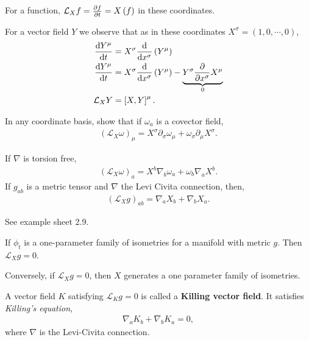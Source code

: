 \begin{example}
    For a function, $\mathcal{L}_X f = \pdv{f}{t} = X \left( f \right) $ in these coordinates.
\end{example}

For a vector field $Y$ we observe that as in these coordinates $X^{\sigma} = \left( 1,0,\cdots,0 \right) $,
\begin{align}
    \dv{Y^{\mu}}{t} &= X^{\sigma} \dv{x^{\sigma}} \left( Y^{\mu} \right)  \\
    \dv{Y^{\mu}}{t} &= X^{\sigma} \dv{x^{\sigma}} \left( Y^{\mu} \right) -  \underbrace{Y^{\sigma} \pdv{x^{\sigma}} X^{\mu}}_{0} \\
   \mathcal{L}_X Y &= \left[ X, Y \right]^{\mu}
.\end{align}

\begin{exercise}
    In any coordinate basis, show that if $\omega_a$ is a covector field,
    \begin{align}
        \left( \mathcal{L}_X \omega \right)_{\mu} = X^{\sigma} \partial_\sigma \omega_\mu + \omega_\sigma \partial_\mu X^{\sigma}
    .\end{align}

    If $\nabla$ is torsion free,
    \begin{align}
        \left( \mathcal{L}_X \omega \right)_a = X^{b} \nabla_b \omega_a + \omega_b \nabla_a X^{b}
    .\end{align}
    If $g_{ab}$ is a metric tensor and $\nabla$ the Levi Civita connection, then,
    \begin{align}
        \left( \mathcal{L}_X g\right)_{ab} = \nabla_a X_b + \nabla_b X_a 
    .\end{align}
\end{exercise}
See example sheet 2.9.

If $\phi_t$ is a one-parameter family of isometries for a manifold with metric $g$. Then $\mathcal{L}_X g = 0$.

Conversely, if $\mathcal{L}_X g = 0$, then $X$ generates a one parameter family of isometries.

\begin{definition}
    A vector field $K$ satisfying $\mathcal{L}_K g = 0$ is called a \textbf{Killing vector field}. It satisfies \textit{Killing's equation},
    \begin{align}
        \nabla_a K_b + \nabla_b K_a = 0
    ,\end{align}
    where $\nabla$ is the Levi-Civita connection.
\end{definition}

